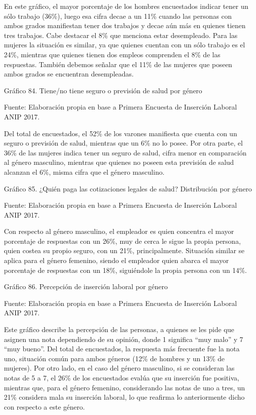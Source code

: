 \documentclass{article}
\begin{document}
En este gráfico, el mayor porcentaje de los hombres encuestados indicar tener un sólo trabajo (36\%), luego esa cifra decae a un 11\% cuando las personas con ambos grados manifiestan tener dos trabajos y decae aún más en quienes tienen tres trabajos. Cabe destacar el 8\% que menciona estar desempleado. Para las mujeres la situación es similar, ya que quienes cuentan con un sólo trabajo es el 24\%, mientras que quienes tienen dos empleos comprenden el 8\% de las respuestas. También debemos señalar que el 11\% de las mujeres que poseen ambos grados se encuentran desempleadas.

Gráfico 84. Tiene/no tiene seguro o previsión de salud por género


Fuente: Elaboración propia en base a Primera Encuesta de Inserción Laboral ANIP 2017.

Del total de encuestados, el 52\% de los varones manifiesta que cuenta con un seguro o previsión de salud, mientras que un 6\% no lo posee. Por otra parte, el 36\% de las mujeres indica tener un seguro de salud, cifra menor en comparación al género masculino, mientras que quienes no poseen esta previsión de salud alcanzan el 6\%, misma cifra que el género masculino.

Gráfico 85. ¿Quién paga las cotizaciones legales de salud? Distribución por género


Fuente: Elaboración propia en base a Primera Encuesta de Inserción Laboral ANIP 2017.

Con respecto al género masculino, el empleador es quien concentra el mayor porcentaje de respuestas con un 26\%, muy de cerca le sigue la propia persona, quien costea su propio seguro, con un 21\%, principalmente. Situación similar se aplica para el género femenino, siendo el empleador quien abarca el mayor porcentaje de respuestas con un 18\%, siguiéndole la propia persona con un 14\%.

Gráfico 86. Percepción de inserción laboral por género


Fuente: Elaboración propia en base a Primera Encuesta de Inserción Laboral ANIP 2017.

Este gráfico describe la percepción de las personas, a quienes se les pide que asignen una nota dependiendo de su opinión, donde 1 significa “muy malo” y 7 “muy bueno”. Del total de encuestados, la respuesta más frecuente fue la nota uno, situación común para ambos géneros (12\% de hombres y un 13\% de mujeres). Por otro lado, en el caso del género masculino, si se consideran las notas de 5 a 7, el 26\% de los encuestados evalúa que su inserción fue positiva, mientras que, para el género femenino, considerando las notas de uno a tres, un 21\% considera mala su inserción laboral, lo que reafirma lo anteriormente dicho con respecto a este género.
\end{document}
